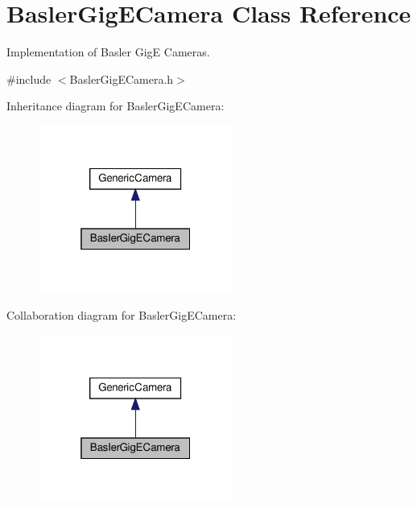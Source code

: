 \hypertarget{classBaslerGigECamera}{}\section{Basler\+Gig\+E\+Camera Class Reference}
\label{classBaslerGigECamera}


Implementation of Basler GigE Cameras.  




{\ttfamily \#include $<$Basler\+Gig\+E\+Camera.\+h$>$}



Inheritance diagram for Basler\+Gig\+E\+Camera\+:\nopagebreak
\begin{figure}[H]
\begin{center}
\leavevmode
\includegraphics[width=181pt]{classBaslerGigECamera__inherit__graph}
\end{center}
\end{figure}


Collaboration diagram for Basler\+Gig\+E\+Camera\+:\nopagebreak
\begin{figure}[H]
\begin{center}
\leavevmode
\includegraphics[width=181pt]{classBaslerGigECamera__coll__graph}
\end{center}
\end{figure}

